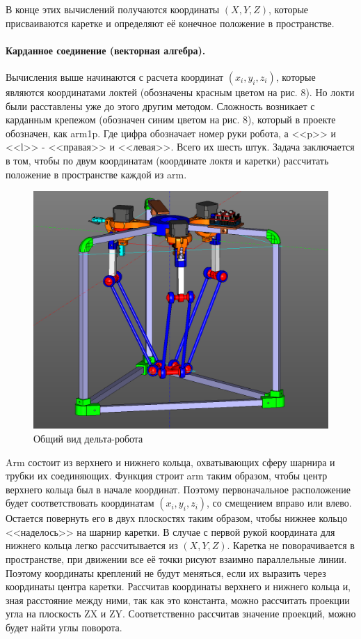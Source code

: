 В конце этих вычислений получаются координаты $(X,Y,Z)$, которые присваиваются каретке и определяют её конечное положение в пространстве.

\paragraph{Карданное соединение (векторная алгебра).} Вычисления выше начинаются с расчета координат $(x_{i},y_{i},z_{i})$, которые являются координатами локтей (обозначены красным цветом на рис. 8). Но локти были расставлены уже до этого другим методом. Сложность возникает с карданным крепежом (обозначен синим цветом на рис. 8), который в проекте обозначен, как arm1p. Где цифра обозначает номер руки робота, а <<p>> и <<l>> - <<правая>> и <<левая>>. Всего их шесть штук. Задача заключается в том, чтобы по двум координатам (координате локтя и каретки) рассчитать положение в пространстве каждой из arm.  

\begin{figure}[h]
\centering
\includegraphics[width=0.8\linewidth]{./image/arm}
\caption{Общий вид дельта-робота}
\end{figure}

Arm состоит из верхнего и нижнего кольца, охватывающих сферу шарнира и трубки их соединяющих. Функция строит arm таким образом, чтобы центр верхнего кольца был в начале координат. Поэтому первоначальное расположение будет соответствовать координатам $(x_{i},y_{i},z_{i})$, со смещением вправо или влево. Остается повернуть его в двух плоскостях таким образом, чтобы нижнее кольцо <<наделось>> на шарнир каретки. В случае с первой рукой координата для нижнего кольца легко рассчитывается из $(X,Y,Z)$. Каретка не поворачивается в пространстве, при движении все её точки рисуют взаимно параллельные линии. Поэтому координаты креплений не будут меняться, если их выразить через координаты центра каретки. Рассчитав координаты верхнего и нижнего кольца и, зная расстояние между ними, так как это константа, можно рассчитать проекции угла на плоскость ZX и ZY. Соответственно рассчитав значение проекций, можно будет найти углы поворота. 

